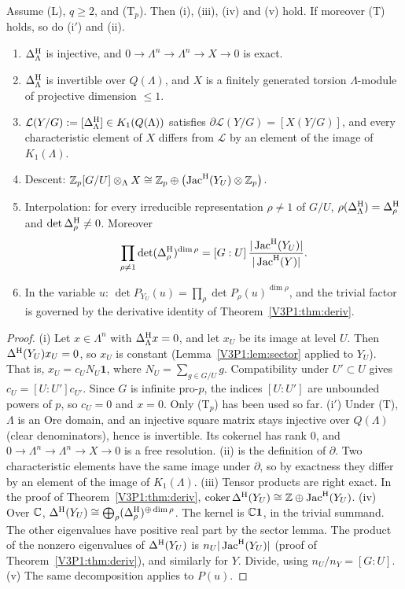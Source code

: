 \begin{theorem}\label{V3P6:thm:main}
Assume \textup{(L)}, $q\ge2$, and \textup{(T$_p$)}. Then \textup{(i)}, \textup{(iii)},
\textup{(iv)} and \textup{(v)} hold. If moreover \textup{(T)} holds, so do \textup{(i$'$)} and
\textup{(ii)}.
\begin{enumerate}
\item[(i)] $\Delta^{\mathrm{H}}_\Lambda$ is injective, and $0\to\Lambda^{n}\to\Lambda^{n}\to X\to0$ is exact.
\item[(i$'$)] $\Delta^{\mathrm{H}}_\Lambda$ is invertible over $Q(\Lambda)$, and $X$ is a finitely generated
torsion $\Lambda$-module of projective dimension $\le1$.
\item[(ii)] $\mathcal L(Y/G):=[\Delta^{\mathrm{H}}_\Lambda]\in K_1(Q(\Lambda))$ satisfies
$\partial\mathcal L(Y/G)=[X(Y/G)]$, and every characteristic element of $X$ differs from
$\mathcal L$ by an element of the image of $K_1(\Lambda)$.
\item[(iii)] Descent: $\mathbb{Z}_p[G/U]\otimes_\Lambda X\cong\mathbb{Z}_p\oplus\bigl(\operatorname{Jac}^{\mathrm{H}}(Y_U)\otimes\mathbb{Z}_p\bigr)$.
\item[(iv)] Interpolation: for every irreducible representation $\rho\ne1$ of $G/U$,
$\rho(\Delta^{\mathrm{H}}_\Lambda)=\Delta^{\mathrm{H}}_\rho$ and $\det\Delta^{\mathrm{H}}_\rho\neq0$. Moreover
\[
\prod_{\rho\neq1}\det(\Delta^{\mathrm{H}}_\rho)^{\dim\rho}=[G:U]\,\frac{|\operatorname{Jac}^{\mathrm{H}}(Y_U)|}{|\operatorname{Jac}^{\mathrm{H}}(Y)|}.
\]
\item[(v)] In the variable $u$: $\det P_{Y_U}(u)=\prod_\rho\det P_\rho(u)^{\dim\rho}$, and the
trivial factor is governed by the derivative identity of Theorem~\ref{V3P1:thm:deriv}.
\end{enumerate}
\end{theorem}

\begin{proof}
(i) Let $x\in\Lambda^{n}$ with $\Delta^{\mathrm{H}}_\Lambda x=0$, and let $x_U$ be its image at level $U$.
Then $\Delta^{\mathrm{H}}(Y_U)x_U=0$, so $x_U$ is constant (Lemma~\ref{V3P1:lem:sector} applied to $Y_U$).
That is, $x_U=c_UN_U\mathbf 1$, where $N_U=\sum_{g\in G/U}g$. Compatibility under $U'\subset U$
gives $c_U=[U:U']c_{U'}$. Since $G$ is infinite pro-$p$, the indices $[U:U']$ are unbounded
powers of $p$, so $c_U=0$ and $x=0$. Only (T$_p$) has been used so far. (i$'$) Under (T),
$\Lambda$ is an Ore domain, and an injective square matrix
stays injective over $Q(\Lambda)$ (clear denominators), hence is invertible. Its cokernel has
rank $0$, and $0\to\Lambda^{n}\to\Lambda^{n}\to X\to0$ is a free resolution. (ii) is the
definition of $\partial$. Two characteristic elements have the same image under $\partial$, so
by exactness they differ by an element of the image of $K_1(\Lambda)$. (iii) Tensor products are
right exact. In the proof of Theorem~\ref{V3P1:thm:deriv}, $\operatorname{coker}\Delta^{\mathrm{H}}(Y_U)\cong\mathbb{Z}\oplus\operatorname{Jac}^{\mathrm{H}}(Y_U)$.
(iv) Over $\mathbb{C}$, $\Delta^{\mathrm{H}}(Y_U)\cong\bigoplus_\rho(\Delta^{\mathrm{H}}_\rho)^{\oplus\dim\rho}$. The kernel is
$\mathbb{C}\mathbf 1$, in the trivial summand. The other eigenvalues have positive real part by the
sector lemma. The product of the nonzero eigenvalues of $\Delta^{\mathrm{H}}(Y_U)$ is
$n_U|\operatorname{Jac}^{\mathrm{H}}(Y_U)|$ (proof of Theorem~\ref{V3P1:thm:deriv}), and similarly for $Y$. Divide, using
$n_U/n_Y=[G:U]$. (v) The same decomposition applies to $P(u)$.
\end{proof}

